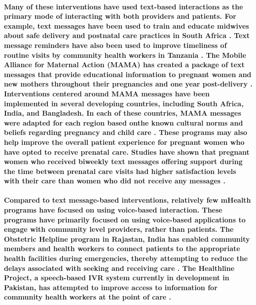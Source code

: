 \paragraph{Many of these interventions have used text-based interactions as the primary mode of interacting with both providers and patients. For example, text messages have been used to train and educate midwives about safe delivery and postnatal care practices in South Africa \citep{Woods2012}. Text message reminders have also been used to improve timeliness of routine visits by community health workers in Tanzania \citep{DeRenzi2012}. The Mobile Alliance for Maternal Action (MAMA) has created a package of text messages that provide educational information to pregnant women and new mothers throughout their pregnancies and one year post-delivery \citep{MAMA}. Interventions centered around MAMA messages have been implemented in several developing countries, including South Africa, India, and Bangladesh. In each of these countries, MAMA messages were adapted for each region based onthe known cultural norms and beliefs regarding pregnancy and child care \citep{McCartney2012}. These programs may also help improve the overall patient experience for pregnant women who have opted to receive prenatal care. Studies have shown that pregnant women who received biweekly text messages offering support during the time between prenatal care visits had higher satisfaction levels with their care than women who did not receive any messages \citep{Jareethum2008}.}

\paragraph{Compared to text message-based interventions, relatively few mHealth programs have focused on using voice-based interaction. These programs have primarily focused on using voice-based applications to engage with community level providers, rather than patients. The Obstetric Helpline program in Rajastan, India has enabled community members and health workers to connect patients to the appropriate health facilities during emergencies, thereby attempting to reduce the delays associated with seeking and receiving care \citep{UNICEF2008}.  The Healthline Project, a speech-based IVR system currently in development in Pakistan, has attempted to improve access to information for community health workers at the point of care \citep{Sherwani2007}.}

